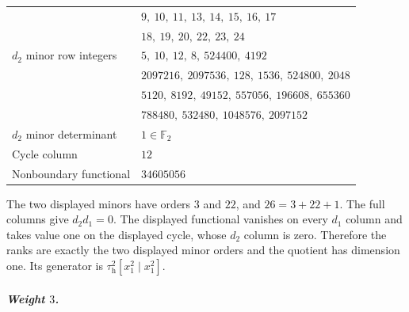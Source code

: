 \begin{longtable}{l l}
 & $9,\ 10,\ 11,\ 13,\ 14,\ 15,\ 16,\ 17$\\
 & $18,\ 19,\ 20,\ 22,\ 23,\ 24$\\
$d_2$ minor row integers & $5,\ 10,\ 12,\ 8,\ 524400,\ 4192$\\
 & $2097216,\ 2097536,\ 128,\ 1536,\ 524800,\ 2048$\\
 & $5120,\ 8192,\ 49152,\ 557056,\ 196608,\ 655360$\\
 & $788480,\ 532480,\ 1048576,\ 2097152$\\
$d_2$ minor determinant & $1\in\mathbb F_2$\\
Cycle column & $12$\\
Nonboundary functional & $34605056$\\
\end{longtable}
The two displayed minors have orders $3$ and $22$, and $26=3+22+1$. 
The full columns give $d_2d_1=0$. The displayed functional vanishes on every $d_1$ column and takes value one on the displayed cycle, whose $d_2$ column is zero. Therefore the ranks are exactly the two displayed minor orders and the quotient has dimension one. Its generator is $\tau_{\mathrm h}^{2}[x_1^2\mid x_1^2]$.
\subparagraph{Weight $3$.}
